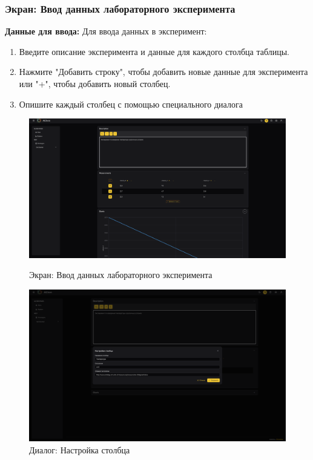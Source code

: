 \documentclass[a4paper,12pt,reqno]{article}
\begin{document}
\subsubsection{Экран: Ввод данных лабораторного эксперимента}
\textbf{Данные для ввода:}  
Для ввода данных в эксперимент:
\begin{enumerate}
    \item Введите описание эксперимента и данные для каждого столбца таблицы.
    \item Нажмите "Добавить строку", чтобы добавить новые данные для эксперимента или "+", чтобы добавить новый столбец.
    \item Опишите каждый столбец с помощью специального диалога
\end{enumerate}
\begin{figure}[H]
    \centering
    \begin{minipage}{0.45\linewidth}
        \centering
        \includegraphics[width=\linewidth]{RO/img/lab_common.png}
        \caption{Экран: Ввод данных лабораторного эксперимента}
        \label{pic:mobile_version}
    \end{minipage}\hfill
    \begin{minipage}{0.45\linewidth}
        \centering
        \includegraphics[width=\linewidth]{RO/img/change_column.png}
        \caption{Диалог: Настройка столбца}
        \label{pic:other_colors}
    \end{minipage}
\end{figure}
\end{document}
